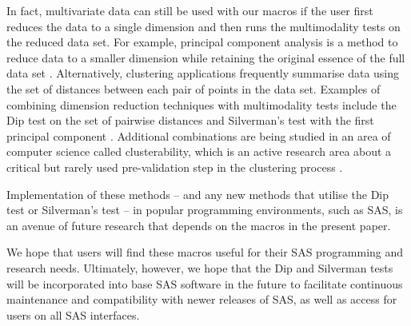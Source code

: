 \documentclass[]{interact}
\theoremstyle{plain}%
\theoremstyle{definition}
\theoremstyle{remark}
\begin{document}
In fact, multivariate data can still be used with our macros if the user first reduces the data to a single dimension and then runs the multimodality tests on the reduced data set. For example, principal component analysis is a method to reduce data to a smaller dimension while retaining the original essence of the full data set \cite{jolliffe2002pca}. Alternatively, clustering applications frequently summarise data using the set of distances between each pair of points in the data set. Examples of combining dimension reduction techniques with multimodality tests include the Dip test on the set of pairwise distances \citep{dip_means} and Silverman's test with the first principal component \cite{Ahmed2012}. Additional combinations are being studied in an area of computer science called clusterability, which is an active research area about a critical but rarely used pre-validation step in the clustering process \citep{clusterability}.

Implementation of these methods -- and any new methods that utilise the Dip test or Silverman's test -- in popular programming environments, such as SAS, is an avenue of future research that depends on the macros in the present paper.


We hope that users will find these macros useful for their SAS programming and research needs. Ultimately, however, we hope that the Dip and Silverman tests will be incorporated into base SAS software in the future to facilitate continuous maintenance and compatibility with newer releases of SAS, as well as access for users on all SAS interfaces. %




\end{document}
